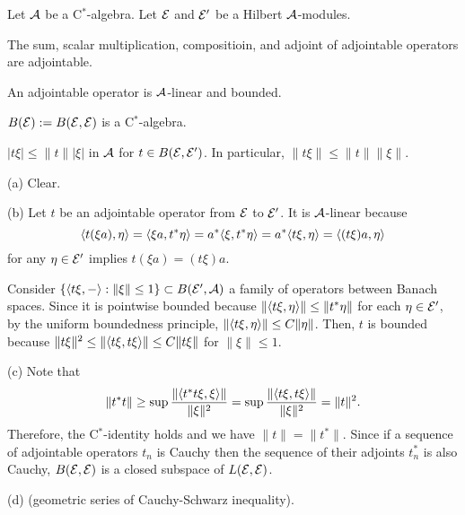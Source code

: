 \documentclass{../../../small}
\begin{document}
\begin{prop}
Let $\mathcal{A}$ be a C$^*$-algebra.
Let $\mathcal{E}$ and $\mathcal{E}'$ be a Hilbert $\mathcal{A}$-modules.
\begin{parts}
\item The sum, scalar multiplication, compositioin, and adjoint of adjointable operators are adjointable.
\item An adjointable operator is $\mathcal{A}$-linear and bounded.
\item $B(\mathcal{E}):=B(\mathcal{E},\mathcal{E})$ is a C$^*$-algebra.
\item $|t\xi|\le\|t\||\xi|$ in $\mathcal{A}$ for $t\in B(\mathcal{E},\mathcal{E}')$. In particular, $\|t\xi\|\le\|t\|\|\xi\|$.
\end{parts}
\end{prop}
\begin{pf}
(a)
Clear.

(b)
Let $t$ be an adjointable operator from $\mathcal{E}$ to $\mathcal{E}'$.
It is $\mathcal{A}$-linear because
\[\langle t(\xi a),\eta\rangle=\langle\xi a,t^*\eta\rangle=a^*\langle\xi,t^*\eta\rangle=a^*\langle t\xi,\eta\rangle=\langle(t\xi)a,\eta\rangle\]
for any $\eta\in\mathcal{E}'$ implies $t(\xi a)=(t\xi)a$.

Consider $\{\langle t\xi,-\rangle:\|\xi\|\le1\}\subset B(\mathcal{E}',\mathcal{A})$ a family of operators between Banach spaces.
Since it is pointwise bounded because $\|\langle t\xi,\eta\rangle\|\le\|t^*\eta\|$ for each $\eta\in\mathcal{E}'$, by the uniform boundedness principle, $\|\langle t\xi,\eta\rangle\|\le C\|\eta\|$.
Then, $t$ is bounded because $\|t\xi\|^2\le\|\langle t\xi,t\xi\rangle\|\le C\|t\xi\|$ for $\|\xi\|\le1$.

(c)
Note that
\[\|t^*t\|\ge\sup\frac{\|\langle t^*t\xi,\xi\rangle\|}{\|\xi\|^2}=\sup\frac{\|\langle t\xi,t\xi\rangle\|}{\|\xi\|^2}=\|t\|^2.\]
Therefore, the C$^*$-identity holds and we have $\|t\|=\|t^*\|$.
Since if a sequence of adjointable operators $t_n$ is Cauchy then the sequence of their adjoints $t_n^*$ is also Cauchy, $B(\mathcal{E},\mathcal{E})$ is a closed subspace of $L(\mathcal{E},\mathcal{E})$.

(d) (geometric series of Cauchy-Schwarz inequality).
\end{pf}
\end{document}
